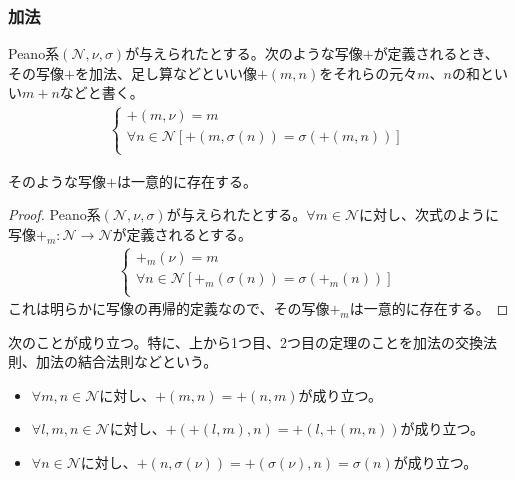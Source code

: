 \documentclass[dvipdfmx]{jsarticle}
\begin{document}
\subsubsection{加法}%
\begin{dfn}
Peano系$\left( \mathcal{N,}\nu,\sigma \right)$が与えられたとする。次のような写像$+$が定義されるとき、その写像$+$を加法、足し算などといい像$+ (m,n)$をそれらの元々$m$、$n$の和といい$m + n$などと書く。
\begin{align*}
\left\{ \begin{matrix}
 + (m,\nu) = m \\
\forall n \in \mathcal{N}\left[ + \left( m,\sigma(n) \right) = \sigma\left( + (m,n) \right) \right] \\
\end{matrix} \right.\ 
\end{align*}
\end{dfn}
\begin{thm}\label{1.2.4.11}
そのような写像$+$は一意的に存在する。
\end{thm}
\begin{proof}
Peano系$\left( \mathcal{N,}\nu,\sigma \right)$が与えられたとする。$\forall m \in \mathcal{N}$に対し、次式のように写像$+_{m}\mathcal{:N \rightarrow N}$が定義されるとする。
\begin{align*}
\left\{ \begin{matrix}
 +_{m}(\nu) = m \\
\forall n \in \mathcal{N}\left[ +_{m}\left( \sigma(n) \right) = \sigma\left( +_{m}(n) \right) \right] \\
\end{matrix} \right.\ 
\end{align*}
これは明らかに写像の再帰的定義なので、その写像$+_{m}$は一意的に存在する。
\end{proof}
\begin{thm}\label{1.2.4.12}
次のことが成り立つ。特に、上から1つ目、2つ目の定理のことを加法の交換法則、加法の結合法則などという。
\begin{itemize}
\item
  $\forall m,n \in \mathcal{N}$に対し、$+ (m,n) = + (n,m)$が成り立つ。
\item
  $\forall l,m,n \in \mathcal{N}$に対し、$+ \left( + (l,m),n \right) = + \left( l, + (m,n) \right)$が成り立つ。
\item
  $\forall n \in \mathcal{N}$に対し、$+ \left( n,\sigma(\nu) \right) = + \left( \sigma(\nu),n \right) = \sigma(n)$が成り立つ。
\end{itemize}
\end{thm}
\end{document}
